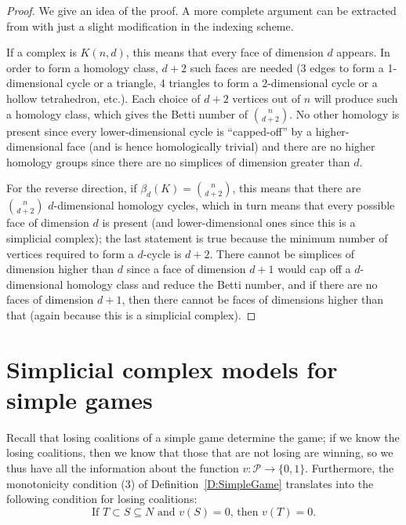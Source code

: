 \documentclass[11pt]{amsart}
\theoremstyle{plain}
\theoremstyle{definition}
\theoremstyle{remark}
\newcommand{\refD}[1]{Definition~\ref{D:#1}}
\begin{document}
\begin{proof}
We give an idea of the proof. A more complete argument can be extracted from \cite[Theorem 4.5]{VV:SimpleGames} with just a slight modification in the indexing scheme.

If a complex is $K(n,d)$, this means that every face of dimension $d$ appears. In order to form a homology class, $d+2$ such faces are needed (3 edges to form a 1-dimensional cycle or a triangle, 4 triangles to form a 2-dimensional cycle or a hollow tetrahedron, etc.). Each choice of $d+2$ vertices out of $n$ will produce such a homology class, which gives the Betti number of ${n \choose d+2}$. No other homology is present since every lower-dimensional cycle is ``capped-off'' by a higher-dimensional face (and is hence homologically trivial) and there are no higher homology groups since there are no simplices of dimension greater than $d$.

For the reverse direction, if $\beta_d(K)={n \choose d+2}$, this means that there are ${n \choose d+2}$ $d$-dimensional homology cycles, which in turn means that every possible face of dimension $d$ is present (and lower-dimensional ones since this is a simplicial complex); the last statement is true because the minimum number of vertices required to form a $d$-cycle is $d+2$. There cannot be simplices of dimension higher than $d$ since a face of dimension $d+1$ would cap off a $d$-dimensional homology class and reduce the Betti number, and if there are no faces of dimension $d+1$, then there cannot be faces of dimensions higher than that (again because this is a simplicial complex).
\end{proof}



\section{Simplicial complex models for simple games}\label{S:SimplicialSimple}




Recall that losing coalitions of a simple game determine the game; if we know the losing coalitions, then we know that those that are not losing are winning, so we thus have all the information about the function $v\colon \mathcal P\to\{0,1\}$. Furthermore, the monotonicity condition (3) of \refD{SimpleGame} translates into the following condition for losing coalitions:
\begin{equation}\label{E:LosingCondition}
\text{If $T\subset S\subseteq N$ and $v(S)=0$, then $v(T)=0$}.
\end{equation}
\end{document}
